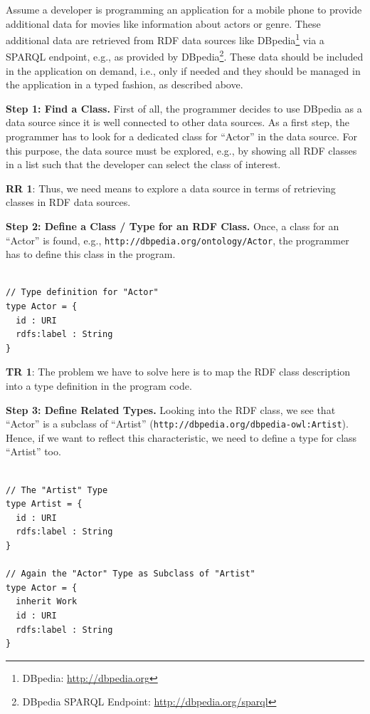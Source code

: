 \documentclass{llncs} %
\newcommand{\rr}[1]{\textbf{RR #1}}
\newcommand{\tr}[1]{\textbf{TR #1}}
\begin{document}
Assume a developer is programming an application for a mobile phone to provide additional
data for movies like information about actors or genre. These additional data
are retrieved from RDF data sources like DBpedia\footnote{DBpedia: \url{http://dbpedia.org}} via a SPARQL endpoint,
e.g., as provided by DBpedia\footnote{DBpedia SPARQL Endpoint: \url{http://dbpedia.org/sparql}}.
These data should be included in the application on demand, i.e., only if needed
and they should be managed in the application in a typed fashion,
as described above.

\vspace{0.8em}
\noindent
\textbf{Step 1: Find a Class.}
First of all, the programmer decides to use DBpedia as a data source since it is well connected to other
data sources. As a first step, the programmer has to look for a dedicated class for ``Actor'' in the data source.
For this purpose, the data source must be explored, e.g., by showing all RDF classes in a list
such that the developer can select the class of interest.

\rr{1}: Thus, we need means to explore a data source in terms of retrieving classes in RDF data sources.

\vspace{0.8em}
\noindent
\textbf{Step 2: Define a Class / Type for  an RDF Class.}
Once, a class for an ``Actor'' is found, e.g., \texttt{http://dbpedia.org/ontology/Actor}, the programmer has
to define this class in the program.

\begin{lstlisting}[style=code, caption={Type Definition for RDF Class ``Movie''}, label={lst:movietype}]

// Type definition for "Actor" 
type Actor = {
  id : URI
  rdfs:label : String 
}
\end{lstlisting}

\tr{1}: The problem we have to solve here is to map the RDF class description into a type definition in the program code.

\vspace{0.8em}
\noindent
\textbf{Step 3: Define Related Types.}
Looking into the RDF class, we see that ``Actor'' is a subclass of ``Artist'' (\texttt{http://dbpedia.org/dbpedia-owl:Artist}).
Hence, if we want to reflect this characteristic, we need to define a type for class ``Artist'' too.

\begin{lstlisting}[style=code, caption={Type Definition for RDF Classes ``Actor'' and ``Artist''}, label={lst:worktype}]

// The "Artist" Type
type Artist = {
  id : URI
  rdfs:label : String
}

// Again the "Actor" Type as Subclass of "Artist"
type Actor = {
  inherit Work
  id : URI
  rdfs:label : String
}
\end{lstlisting}
\end{document}
